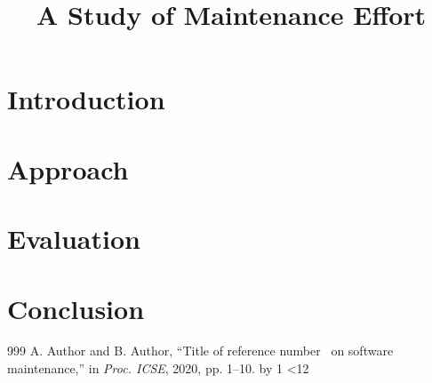 \documentclass[conference,letterpaper,9pt]{IEEEtran}
\begin{document}
\title{A Study of Maintenance Effort}
\author{}
\maketitle
\begin{abstract}
\lipsum[1]
\end{abstract}
\section{Introduction}
\lipsum[2-20]
\section{Approach}
\lipsum[21-50]
\section{Evaluation}
\lipsum[51-80]
\section{Conclusion}
\lipsum[81-118]
\begin{thebibliography}{999}
\newcount\n {}
\loop {} A. Author and B. Author, ``Title of reference number \the\n\ on software maintenance,'' in \emph{Proc. ICSE}, 2020, pp. 1--10.
\advance\n by 1 \ifnum\n<12 \repeat
\end{thebibliography}
\end{document}
